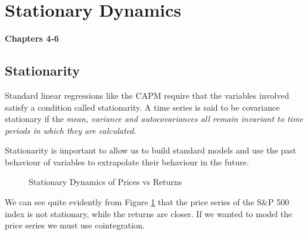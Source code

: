 \documentclass[11pt]{article}
\begin{document}
\newpage
\section{Stationary Dynamics}
\textbf{Chapters 4-6}

\subsection{Stationarity}
Standard linear regressions like the CAPM require that the variables involved satisfy a condition called stationarity. A time series is said to be covariance stationary if the \textit{mean, variance and autocovariances all remain invariant to time periods in which they are calculated}.

Stationarity is important to allow us to build standard models and use the past behaviour of variables to extrapolate their behaviour in the future.

\begin{figure}[h]
    \centering
    \qquad
    \caption{Stationary Dynamics of Prices vs Returns}%
    \label{fig:prices vs returns}%
\end{figure}

We can see quite evidently from Figure \ref{fig:prices vs returns} that the price series of the S\&P 500 index is not stationary, while the returns are closer. If we wanted to model the price series we must use cointegration.
\end{document}

